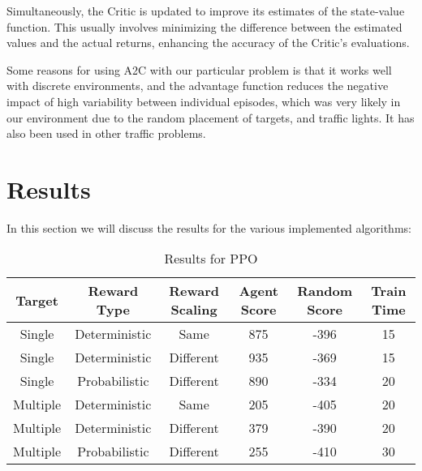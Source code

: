 \documentclass{article}
\begin{document}
    Simultaneously, the Critic is updated to improve its estimates of the state-value function. This usually involves minimizing the difference between the estimated values and the actual returns, enhancing the accuracy of the Critic's evaluations.
    
    Some reasons for using A2C with our particular problem is that it works well with discrete environments, and the advantage function reduces the negative impact of high variability between individual episodes, which was very likely in our environment due to the random placement of targets, and traffic lights. It has also been used in other traffic problems.

    \section{Results}
    \label{results}
    In this section we will discuss the results for the various implemented algorithms:
    
    \begin{table*}[h]
        \centering
        \caption[]{Results for PPO}\label{Results for PPO}%
        \begin{tabular}{cccccc}
            \toprule
            Target & Reward Type & Reward Scaling\footnotemark[1] & Agent Score\footnotemark[2] & Random Score\footnotemark[2] & Train Time\footnotemark[3]\\
            \midrule
            Single &  Deterministic & Same & 875 & -396 & 15\\
            Single & Deterministic & Different\footnotemark[4] & 935 & -369 & 15\\
            Single & Probabilistic & Different & 890 & -334 & 20\\
            \midrule
            Multiple & Deterministic & Same & 205 & -405 & 20\\
            Multiple & Deterministic & Different & 379 & -390 & 20\\
            Multiple & Probabilistic & Different & 255 & -410 & 30\\
            \bottomrule
        \end{tabular}
        \label{tab: PPO_Table}
    \end{table*}
    
\end{document}
